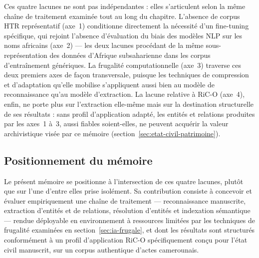 Ces quatre lacunes ne sont pas indépendantes : elles s'articulent selon la même chaîne de traitement examinée tout au long du chapitre. L'absence de corpus HTR représentatif (axe~1) conditionne directement la nécessité d'un fine-tuning spécifique, qui rejoint l'absence d'évaluation du biais des modèles NLP sur les noms africains (axe~2) --- les deux lacunes procédant de la même sous-représentation des données d'Afrique subsaharienne dans les corpus d'entraînement génériques. La frugalité computationnelle (axe~3) traverse ces deux premiers axes de façon transversale, puisque les techniques de compression et d'adaptation qu'elle mobilise s'appliquent aussi bien au modèle de reconnaissance qu'au modèle d'extraction. La lacune relative à RiC-O (axe~4), enfin, ne porte plus sur l'extraction elle-même mais sur la destination structurelle de ses résultats : sans profil d'application adapté, les entités et relations produites par les axes~1 à~3, aussi fiables soient-elles, ne peuvent acquérir la valeur archivistique visée par ce mémoire (section~\ref{sec:etat-civil-patrimoine}).


\subsection{Positionnement du mémoire}
\label{sec:positionnement}

Le présent mémoire se positionne à l'intersection de ces quatre lacunes, plutôt que sur l'une d'entre elles prise isolément. Sa contribution consiste à concevoir et évaluer empiriquement une chaîne de traitement --- reconnaissance manuscrite, extraction d'entités et de relations, résolution d'entités et indexation sémantique --- rendue déployable en environnement à ressources limitées par les techniques de frugalité examinées en section~\ref{sec:ia-frugale}, et dont les résultats sont structurés conformément à un profil d'application RiC-O spécifiquement conçu pour l'état civil manuscrit, sur un corpus authentique d'actes camerounais.

